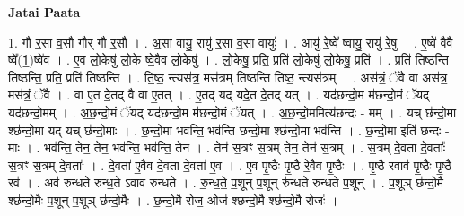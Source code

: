\documentclass[17pt]{extarticle}
\begin{document}
\textbf{Jatai Paata} \newline

1. गौ र॒सा व॒सौ गौर् गौ र॒सौ । . अ॒सा वायु॒ रायु॑ र॒सा व॒सा वायुः॑ । . आयु॑ रे॒ष्वे᳚ ष्वायु॒ रायु॑ रे॒षु । . ए॒ष्वे॑ वैवै ष्वे᳚(1॒)ष्वे॑व । . ए॒व लो॒केषु॑ लो॒के ष्वे॒वैव लो॒केषु॑ । . लो॒केषु॒ प्रति॒ प्रति॑ लो॒केषु॑ लो॒केषु॒ प्रति॑ । . प्रति॑ तिष्ठन्ति तिष्ठन्ति॒ प्रति॒ प्रति॑ तिष्ठन्ति । . ति॒ष्ठ॒ न्त्यस॑त्र॒ मस॑त्रम् तिष्ठन्ति तिष्ठ॒ न्त्यस॑त्रम् । . अस॑त्रं॒ ॅवै वा अस॑त्र॒ मस॑त्रं॒ ॅवै । . वा ए॒त दे॒तद् वै वा ए॒तत् । . ए॒तद् यद् यदे॒त दे॒तद् यत् । . यद॑छन्दो॒म म॑छन्दो॒मं ॅयद् यद॑छन्दो॒मम् । . अ॒छ॒न्दो॒मं ॅयद् यद॑छन्दो॒म म॑छन्दो॒मं ॅयत् । . अ॒छ॒न्दो॒ममित्य॑छन्दः - मम् । . यच् छ॑न्दो॒मा श्छ॑न्दो॒मा यद् यच् छ॑न्दो॒माः । . छ॒न्दो॒मा भव॑न्ति॒ भव॑न्ति छन्दो॒मा श्छ॑न्दो॒मा भव॑न्ति । . छ॒न्दो॒मा इति॑ छन्दः - माः । . भव॑न्ति॒ तेन॒ तेन॒ भव॑न्ति॒ भव॑न्ति॒ तेन॑ । . तेन॑ स॒त्रꣳ स॒त्रम् तेन॒ तेन॑ स॒त्रम् । . स॒त्रम् दे॒वता॑ दे॒वताः᳚ स॒त्रꣳ स॒त्रम् दे॒वताः᳚ । . दे॒वता॑ ए॒वैव दे॒वता॑ दे॒वता॑ ए॒व । . ए॒व पृ॒ष्ठैः पृ॒ष्ठै रे॒वैव पृ॒ष्ठैः । . पृ॒ष्ठै रवाव॑ पृ॒ष्ठैः पृ॒ष्ठै रव॑ । . अव॑ रुन्धते रुन्ध॒ते ऽवाव॑ रुन्धते । . रु॒न्ध॒ते॒ प॒शून् प॒शून् रु॑न्धते रुन्धते प॒शून् । . प॒शूञ् छ॑न्दो॒मै श्छ॑न्दो॒मैः प॒शून् प॒शूञ् छ॑न्दो॒मैः । . छ॒न्दो॒मै रोज॒ ओज॑ श्छन्दो॒मै श्छ॑न्दो॒मै रोजः॑ । \newline
\end{document}
